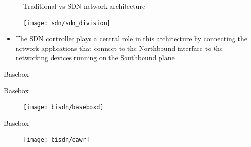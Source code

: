 \documentclass{beamer}
\begin{document}
\begin{frame}
    \begin{figure}[!tbph]
      \centering
      \caption {Traditional vs SDN network architecture}
    \end{figure}
\end{frame}

\begin{frame}
    \begin{figure}[!tbph]
        \centering
        \texttt{[image: sdn/sdn\_division]}
    \end{figure}
    \begin{itemize}
        \item The SDN controller plays a central role in this architecture by connecting the network applications that connect to the Northbound interface to the
            networking devices running on the Southbound plane
    \end{itemize}
\end{frame}

\begin{frame}{Basebox}
\end{frame}

\begin{frame}{Basebox}
    \begin{figure}[!tbph]
        \centering
        \texttt{[image: bisdn/baseboxd]}
    \end{figure}

\end{frame}

\begin{frame}{Basebox}
    \begin{figure}[!tbph]
        \centering
        \texttt{[image: bisdn/cawr]}
    \end{figure}
\end{frame}
\end{document}

